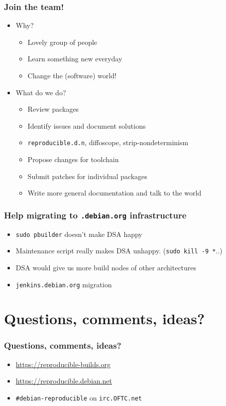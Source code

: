 \documentclass[14pt]{beamer}
\begin{document}
\begin{frame}
 \frametitle{Join the team!}

 \begin{itemize}
  \item Why?
   \begin{itemize}
    \item \heartsuit{}\heartsuit{}\heartsuit{} Lovely group of people \heartsuit{}\heartsuit{}\heartsuit{}
    \item Learn something new everyday
    \item Change the (software) world!
   \end{itemize}
  \item What do we do?
   \begin{itemize}
    \item Review packages
    \item Identify issues and document solutions
    \item \texttt{reproducible.d.n}, diffoscope, strip-nondeterminism
    \item Propose changes for toolchain
    \item Submit patches for individual packages
    \item Write more general documentation and talk to the world
   \end{itemize}
 \end{itemize}
\end{frame}

\begin{frame}
 \frametitle{Help migrating to \texttt{.debian.org} infrastructure}

 \begin{itemize}
  \item \texttt{sudo pbuilder} doesn't make DSA happy
  \item Maintenance script really makes DSA unhappy. (\texttt{sudo kill -9 *}..)
  \item DSA would give us more build nodes of other architectures
  \item \texttt{jenkins.debian.org} migration
 \end{itemize}
\end{frame}

\section{Questions, comments, ideas?}


\begin{frame}
 \frametitle{Questions, comments, ideas?}

 \begin{itemize}
  \item \url{https://reproducible-builds.org}
  \item \url{https://reproducible.debian.net}
  \item \texttt{\#debian-reproducible} on \texttt{irc.OFTC.net}
 \end{itemize}
\end{frame}
\end{document}
